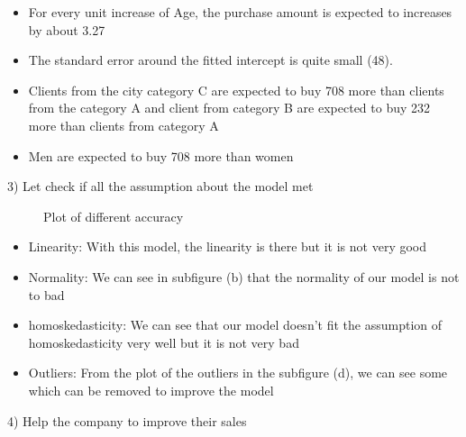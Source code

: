 \documentclass[11pt,a4paper]{article}
\begin{document}
\begin{itemize}
	\item For every unit increase of Age, the purchase amount is expected to increases by about 3.27
	\item The standard error around the fitted intercept is quite small (48).
	\item Clients from the city category C are expected to buy 708 more than clients from the category A and client from category B are expected to buy 232 more than clients from category A
	\item Men are expected to buy 708 more than women
\end{itemize}
3) Let check if all the assumption about the model met


\begin{figure}[H]
	\centering
	
	\caption{Plot of different accuracy}\label{fig:trapez}
\end{figure}


\begin{itemize}
	\item Linearity:  With this model, the linearity is there but it is not very good
	\item Normality: We can see in subfigure (b) that the normality of our model is not to bad
	\item homoskedasticity: We can see that our model doesn't fit the assumption of homoskedasticity very well but it is not very bad 
	\item Outliers: From the plot of the outliers in the subfigure (d), we can see some which can be removed to improve the model
\end{itemize}
4) Help the company to improve their sales
\end{document}

